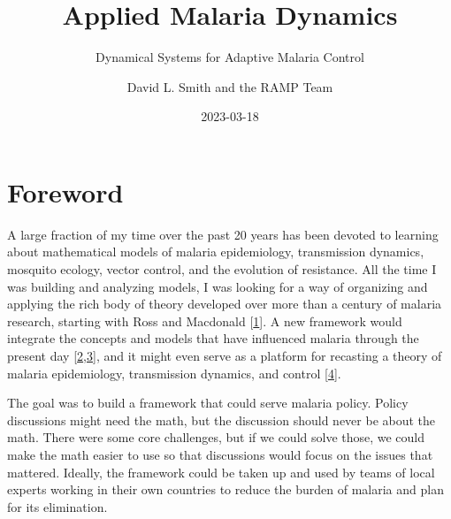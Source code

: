 \documentclass[
]{book}
\title{Applied Malaria Dynamics}
\subtitle{Dynamical Systems for Adaptive Malaria Control}
\author{David L. Smith and the RAMP Team}
\date{2023-03-18}
\begin{document}
\maketitle

{
\setcounter{tocdepth}{2}
\tableofcontents
}
\hypertarget{foreword}{%
\chapter*{Foreword}\label{foreword}}

A large fraction of my time over the past 20 years has been devoted to learning about mathematical models of malaria epidemiology, transmission dynamics, mosquito ecology, vector control, and the evolution of resistance. All the time I was building and analyzing models, I was looking for a way of organizing and applying the rich body of theory developed over more than a century of malaria research, starting with Ross and Macdonald {[}\protect\hyperlink{ref-SmithDL2012_RossMacdonald}{1}{]}.
A new framework would integrate the concepts and models that have influenced malaria through the present day {[}\protect\hyperlink{ref-ReinerRCJ2013SystematicReview}{2},\protect\hyperlink{ref-SmithNR2018AgentbasedModels}{3}{]}, and it might even serve as a platform for recasting a theory of malaria epidemiology, transmission dynamics, and control {[}\protect\hyperlink{ref-SmithDL2014_Recasting}{4}{]}.

The goal was to build a framework that could serve malaria policy. Policy discussions might need the math, but the discussion should never be about the math. There were some core challenges, but if we could solve those, we could make the math easier to use so that discussions would focus on the issues that mattered. Ideally, the framework could be taken up and used by teams of local experts working in their own countries to reduce the burden of malaria and plan for its elimination.
\end{document}
